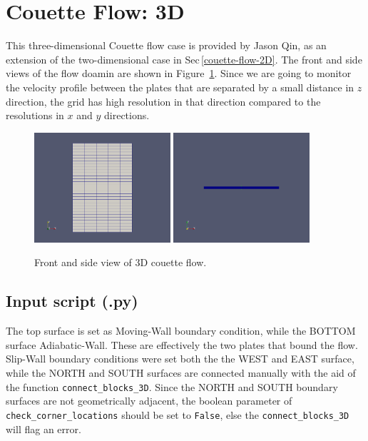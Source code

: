 
\newpage
\section{Couette Flow: 3D}
\label{couette-flow-3D}
%
This three-dimensional Couette flow case is provided by Jason Qin, 
as an extension of the two-dimensional case in Sec\,\ref{couette-flow-2D}.
The front and side views of the flow doamin are shown in Figure~\ref{couette3-frontside-fig}. 
Since we are going to monitor the velocity profile between the plates 
that are separated by a small distance in $z$ direction, 
the grid has high resolution in that direction compared 
to the resolutions in $x$ and $y$ directions. 

\begin{figure}[htbp]
\begin{center}
\includegraphics[width=0.45\textwidth]{../3D/couette-flow/front-view.png}
\includegraphics[width=0.45\textwidth]{../3D/couette-flow/side-view.png}
\end{center}
\caption{Front and side view of 3D couette flow.}
   \label{couette3-frontside-fig}
\end{figure}

\bigskip
\subsection{Input script (.py)}
%
The top surface is set as Moving-Wall boundary condition, while the BOTTOM surface Adiabatic-Wall.
These are effectively the two plates that bound the flow.
Slip-Wall boundary conditions were set both the the WEST and EAST surface, 
while the NORTH and SOUTH surfaces are connected manually
with the aid of the function \verb!connect_blocks_3D!.
Since the NORTH and SOUTH boundary surfaces are not geometrically adjacent, 
the boolean parameter of \verb!check_corner_locations! should be
set to \verb!False!, else the \verb!connect_blocks_3D! will flag an error.

